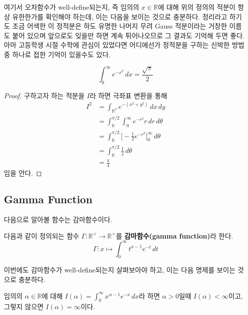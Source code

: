 여기서 오차함수가 well-define되는지, 즉 임의의 $x\in\mathbb{R}$에 대해 위의 정의의 적분이 항상 유한한가를 확인해야 하는데, 이는 다음을 보이는 것으로 충분하다. 정리라고 하기도 조금 어색한 이 정적분은 하도 유명한 나머지 무려 Gauss 적분이라는 거창한 이름도 붙어 있으며 앞으로도 잊을만 하면 계속 튀어나오므로 그 결과도 기억해 두면 좋다. 아마 고등학생 시절 수학에 관심이 있었다면 어디에선가 정적분을 구하는 신박한 방법 중 하나로 접한 기억이 있을수도 있다.

\begin{theorem}
    \begin{equation*}
        \int_0^\infty e^{-x^2}\,dx=\frac{\sqrt{\pi}}{2}
    \end{equation*}
\end{theorem}

\begin{proof}
    구하고자 하는 적분을 $I$라 하면 극좌표 변환을 통해
    \begin{align*}
        I^2&=\int_{\mathbb{R}^2}e^{-(x^2+y^2)}\,dx\,dy\\
        &=\int_0^{\pi/2}\int_0^\infty e^{-r^2}r\,dr\,d\theta\\
        &=\int_0^{\pi/2}\bigg[-\frac{1}{2}e^{-r^2}\bigg]_0^\infty\,d\theta\\
        &=\int_0^{\pi/2}\frac{1}{2}\,d\theta\\
        &=\frac{\pi}{4}
    \end{align*}
    임을 안다.
\end{proof}

\subsection{Gamma Function}

다음으로 알아볼 함수는 감마함수이다.

\begin{definition}
    다음과 같이 정의되는 함수 $\Gamma:\mathbb{R}^+\to\mathbb{R}^+$를 \textbf{감마함수(gamma function)}라 한다.
    \begin{equation*}
        \Gamma:x\mapsto\int_0^\infty t^{x-1}e^{-t}\,dt
    \end{equation*}
\end{definition}

이번에도 감마함수가 well-define되는지 살펴보아야 하고, 이는 다음 명제를 보이는 것으로 충분하다.

\begin{proposition}
    임의의 $\alpha\in\mathbb{R}$에 대해 $I(\alpha)=\int_0^\infty x^{\alpha-1}e^{-x}\,dx$라 하면 $\alpha>0$일때 $I(\alpha)<\infty$이고, 그렇지 않으면 $I(\alpha)=\infty$이다.
\end{proposition}

